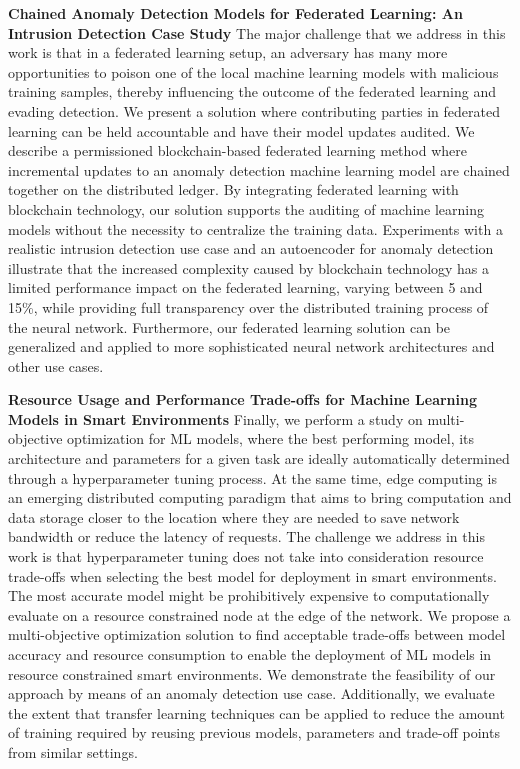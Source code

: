 \textbf{Chained Anomaly Detection Models for Federated Learning: An Intrusion Detection Case Study}
The major challenge that we address in this work is that in a federated learning setup, an adversary has many more opportunities to poison one of the local machine learning models with malicious training samples, thereby influencing the outcome of the federated learning and evading detection.
We present a solution where contributing parties in federated learning can be held accountable and have their model updates audited.
We describe a permissioned blockchain-based federated learning method where incremental updates to an anomaly detection machine learning model are chained together on the distributed ledger.
By integrating federated learning with blockchain technology, our solution supports the auditing of machine learning models without the necessity to centralize the training data.
Experiments with a realistic intrusion detection use case and an autoencoder for anomaly detection illustrate that the increased complexity caused by blockchain technology has a limited performance impact on the federated learning, varying between 5 and 15\%, while providing full transparency over the distributed training process of the neural network.
Furthermore, our federated learning solution can be generalized and applied to more sophisticated neural network architectures and other use cases.

\begin{myleftbar}
\end{myleftbar}

\textbf{Resource Usage and Performance Trade-offs for Machine Learning Models in Smart Environments}
Finally, we perform a study on multi-objective optimization for ML models, where the best performing model, its architecture and parameters for a given task are ideally automatically determined through a hyperparameter tuning process.
At the same time, edge computing is an emerging distributed computing paradigm that aims to bring computation and data storage closer to the location where they are needed to save network bandwidth or reduce the latency of requests.
The challenge we address in this work is that hyperparameter tuning does not take into consideration resource trade-offs when selecting the best model for deployment in smart environments.
The most accurate model might be prohibitively expensive to computationally evaluate on a resource constrained node at the edge of the network.
We propose a multi-objective optimization solution to find acceptable trade-offs between model accuracy and resource consumption to enable the deployment of ML models in resource constrained smart environments.
We demonstrate the feasibility of our approach by means of an anomaly detection use case.
Additionally, we evaluate the extent that transfer learning techniques can be applied to reduce the amount of training required by reusing previous models, parameters and trade-off points from similar settings.


